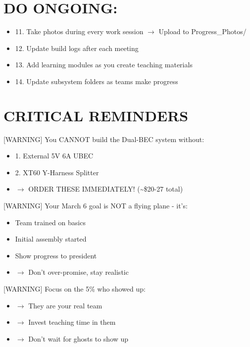 \documentclass[11pt,letterpaper]{article}
\begin{document}
{{{{\section{ DO ONGOING:}

\begin{itemize}
  \item 11. Take photos during every work session $\rightarrow$ Upload to Progress\_Photos/
  \item 12. Update build logs after each meeting
  \item 13. Add learning modules as you create teaching materials
  \item 14. Update subsystem folders as teams make progress
\end{itemize}

\section{CRITICAL REMINDERS}

[WARNING]  You CANNOT build the Dual-BEC system without:\par

\begin{itemize}
  \item 1. External 5V 6A UBEC
  \item 2. XT60 Y-Harness Splitter
  \item $\rightarrow$ ORDER THESE IMMEDIATELY! (\textasciitilde{}\$20-27 total)
\end{itemize}

[WARNING]  Your March 6 goal is NOT a flying plane - it's:\par

\begin{itemize}
  \item Team trained on basics
  \item Initial assembly started
  \item Show progress to president
  \item $\rightarrow$ Don't over-promise, stay realistic
\end{itemize}

[WARNING]  Focus on the 5\% who showed up:\par

\begin{itemize}
  \item $\rightarrow$ They are your real team
  \item $\rightarrow$ Invest teaching time in them
  \item $\rightarrow$ Don't wait for ghosts to show up
\end{itemize}

}}}}
\end{document}
